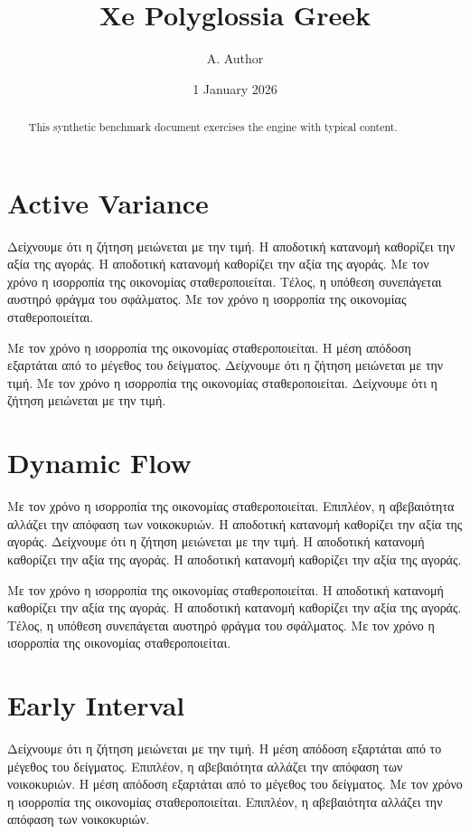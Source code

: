 \documentclass[11pt]{article}
\title{Xe Polyglossia Greek}
\author{A. Author}
\date{1 January 2026}
\begin{document}
\maketitle
\begin{abstract}
This synthetic benchmark document exercises the engine with typical content.
\end{abstract}
\tableofcontents
\section{Active Variance}\label{sec:1}

Δείχνουμε ότι η ζήτηση μειώνεται με την τιμή. Η αποδοτική κατανομή καθορίζει την αξία της αγοράς. Η αποδοτική κατανομή καθορίζει την αξία της αγοράς. Με τον χρόνο η ισορροπία της οικονομίας σταθεροποιείται. Τέλος, η υπόθεση συνεπάγεται αυστηρό φράγμα του σφάλματος. Με τον χρόνο η ισορροπία της οικονομίας σταθεροποιείται.

Με τον χρόνο η ισορροπία της οικονομίας σταθεροποιείται. Η μέση απόδοση εξαρτάται από το μέγεθος του δείγματος. Δείχνουμε ότι η ζήτηση μειώνεται με την τιμή. Με τον χρόνο η ισορροπία της οικονομίας σταθεροποιείται. Δείχνουμε ότι η ζήτηση μειώνεται με την τιμή.

\section{Dynamic Flow}\label{sec:2}

Με τον χρόνο η ισορροπία της οικονομίας σταθεροποιείται. Επιπλέον, η αβεβαιότητα αλλάζει την απόφαση των νοικοκυριών. Η αποδοτική κατανομή καθορίζει την αξία της αγοράς. Δείχνουμε ότι η ζήτηση μειώνεται με την τιμή. Η αποδοτική κατανομή καθορίζει την αξία της αγοράς. Η αποδοτική κατανομή καθορίζει την αξία της αγοράς.

Με τον χρόνο η ισορροπία της οικονομίας σταθεροποιείται. Η αποδοτική κατανομή καθορίζει την αξία της αγοράς. Η αποδοτική κατανομή καθορίζει την αξία της αγοράς. Τέλος, η υπόθεση συνεπάγεται αυστηρό φράγμα του σφάλματος. Με τον χρόνο η ισορροπία της οικονομίας σταθεροποιείται.

\section{Early Interval}\label{sec:3}

Δείχνουμε ότι η ζήτηση μειώνεται με την τιμή. Η μέση απόδοση εξαρτάται από το μέγεθος του δείγματος. Επιπλέον, η αβεβαιότητα αλλάζει την απόφαση των νοικοκυριών. Η μέση απόδοση εξαρτάται από το μέγεθος του δείγματος. Με τον χρόνο η ισορροπία της οικονομίας σταθεροποιείται. Επιπλέον, η αβεβαιότητα αλλάζει την απόφαση των νοικοκυριών.
\end{document}
